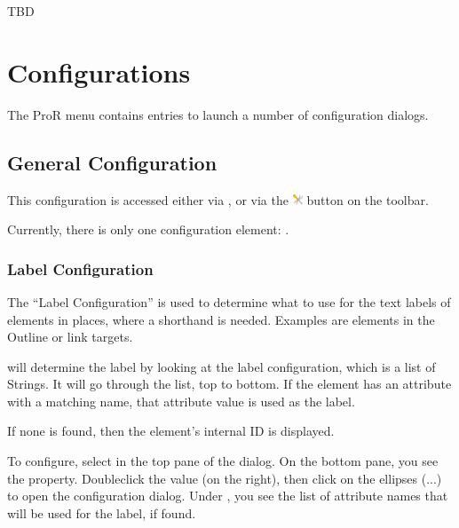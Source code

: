 {{{TBD

\section{Configurations}

The ProR menu contains entries to launch a number of configuration
dialogs.

\subsection{General Configuration}
\label{sec:general_configuration}

This configuration is accessed either via , or
via the \includegraphics[height=0.8em]{../rmf-images/ReqIFUIToolExtension.png} button on the toolbar.

Currently, there is only one configuration element: .

\subsubsection{Label Configuration}

The ``Label Configuration'' is used to determine what to use for the text labels of elements
in places, where a shorthand is needed.  Examples are elements in the Outline or link targets.

\pror{} will determine the label by looking at the label configuration, which is a list of Strings.
It will go through the list, top to bottom.  If the element has an attribute with a matching name,
that attribute value is used as the label.

If none is found, then the element's internal ID is displayed.

To configure, select  in the top pane of the dialog.  On the bottom pane,
you see the  property.  Doubleclick the value (on the right), then click on the
ellipses (...) to open the configuration dialog.  Under , you see the list of attribute
names that will be used for the label, if found.

}}}
